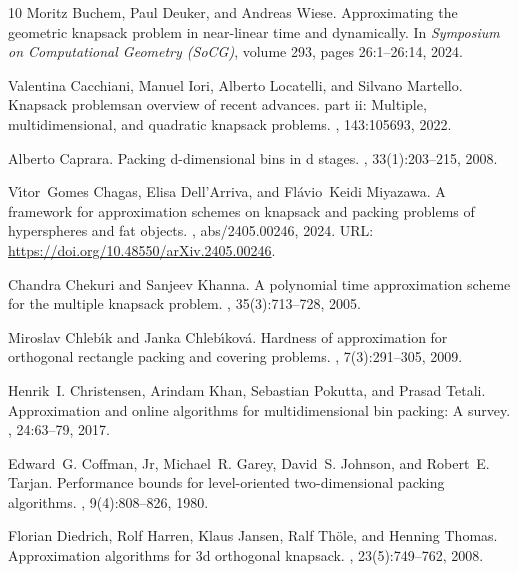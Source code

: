\begin{thebibliography}{10}
Moritz Buchem, Paul Deuker, and Andreas Wiese.
\newblock Approximating the geometric knapsack problem in near-linear time and
  dynamically.
\newblock In {\em Symposium on Computational Geometry (SoCG)}, volume 293,
  pages 26:1--26:14, 2024.

Valentina Cacchiani, Manuel Iori, Alberto Locatelli, and Silvano Martello.
\newblock Knapsack problems\textemdash{}an overview of recent advances. part ii:
  Multiple, multidimensional, and quadratic knapsack problems.
, 143:105693, 2022.

Alberto Caprara.
\newblock Packing d-dimensional bins in d stages.
, 33(1):203--215, 2008.

V{\'{\i}}tor~Gomes Chagas, Elisa Dell'Arriva, and Fl{\'{a}}vio~Keidi Miyazawa.
\newblock A framework for approximation schemes on knapsack and packing
  problems of hyperspheres and fat objects.
, abs/2405.00246, 2024.
\newblock URL: \url{https://doi.org/10.48550/arXiv.2405.00246}.

Chandra Chekuri and Sanjeev Khanna.
\newblock A polynomial time approximation scheme for the multiple knapsack
  problem.
, 35(3):713--728, 2005.

Miroslav Chleb{\'{\i}}k and Janka Chleb{\'{\i}}kov{\'{a}}.
\newblock Hardness of approximation for orthogonal rectangle packing and
  covering problems.
, 7(3):291--305, 2009.

Henrik~I. Christensen, Arindam Khan, Sebastian Pokutta, and Prasad Tetali.
\newblock Approximation and online algorithms for multidimensional bin packing:
  A survey.
, 24:63--79, 2017.

Edward~G. Coffman, Jr, Michael~R. Garey, David~S. Johnson, and Robert~E.
  Tarjan.
\newblock Performance bounds for level-oriented two-dimensional packing
  algorithms.
, 9(4):808--826, 1980.

Florian Diedrich, Rolf Harren, Klaus Jansen, Ralf Th{\"{o}}le, and Henning
  Thomas.
\newblock Approximation algorithms for 3d orthogonal knapsack.
, 23(5):749--762,
  2008.


\end{thebibliography}
